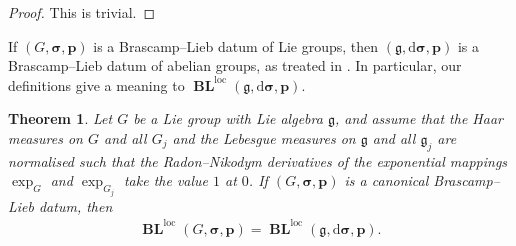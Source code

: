\documentclass[12pt,twoside,a4paper]{amsart}
\newtheorem{thm}{Theorem}[section]
\theoremstyle{definition}
\theoremstyle{remark}
\numberwithin{equation}{section}
\newcommand{\Lie}[1]{\mathfrak{#1}}
\newcommand{\loc}{\mathrm{loc}}
\newcommand{\BL}{\operatorname{\mathbf{BL}}}
\newcommand{\bss}{\boldsymbol{\sigma}}
\newcommand{\bsDs}{\boldsymbol{\mathrm{d}\sigma}}
\newcommand{\bsp}{\boldsymbol{p}}
\begin{document}
\begin{proof}
This is trivial.
\end{proof}

If $(G,\bss,\bsp)$ is a Brascamp--Lieb datum of Lie groups, then $(\Lie{g}, \bsDs, \bsp)$ is a Brascamp--Lieb datum of abelian groups, as treated in \cite{BCCT08}.
In particular, our definitions give a meaning to $\BL^{\loc}(\Lie{g}, \bsDs, \bsp)$.

\begin{thm}\label{thm:G-loc-g-loc}
Let $G$ be a Lie group with Lie algebra $\Lie{g}$, and assume that the Haar measures on $G$ and all $G_j$ and the Lebesgue measures on $\Lie{g}$ and all $\Lie{g}_j$ are normalised such that the Radon--Nikodym derivatives of the exponential mappings $\exp_G$ and $\exp_{G_j}$ take the value $1$ at $0$.
If $(G,\bss ,\bsp)$ is a canonical Brascamp--Lieb datum, then 
\begin{align*}
\BL^{\loc}(G,\bss ,\bsp) = \BL^{\loc}(\Lie{g},\bsDs ,\bsp).
\end{align*}
\end{thm}
\end{document}
